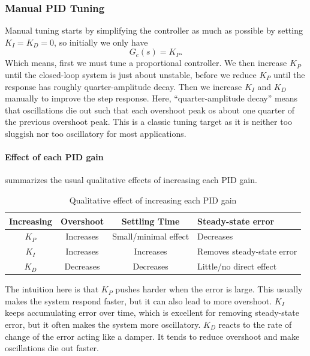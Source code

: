\subsubsection{Manual PID Tuning}
Manual tuning starts by simplifying the controller as much as possible by setting $K_I = K_D = 0$, so initially we only have
\begin{equation*}
  G_c(s) = K_P
.\end{equation*}
Which means, first we must tune a proportional controller.
We then increase $K_P$ until the closed-loop system is just about unstable, before we reduce $K_P$ until the response has roughly quarter-amplitude decay.
Then we increase $K_I$ and $K_D$ manually to improve the step response.
Here, ``quarter-amplitude decay'' means that oscillations die out such that each overshoot peak os about one quarter of the previous overshoot peak.
This is a classic tuning target as it is neither too sluggish nor too oscillatory for most applications.

\paragraph{Effect of each PID gain}
 summarizes the usual qualitative effects of increasing each PID gain.
\begin{table}[ht]
  \caption{Qualitative effect of increasing each PID gain}
  \label{tab:PIDq}
\begin{tabular}{|c|c|c|l|}
\hline
\textbf{Increasing} & \textbf{Overshoot} & \textbf{Settling Time} & \textbf{Steady-state error} \\ \hline
$K_P$               & Increases          & Small/minimal effect   & Decreases                   \\ \hline
$K_I$               & Increases          & Increases              & Removes steady-state error  \\ \hline
$K_D$               & Decreases          & Decreases              & Little/no direct effect     \\ \hline
\end{tabular}
\end{table}
The intuition here is that $K_P$ pushes harder when the error is large.
This usually makes the system respond faster, but it can also lead to more overshoot.
$K_I$ keeps accumulating error over time, which is excellent for removing steady-state error, but it often makes the system more oscillatory.
$K_D$ reacts to the rate of change of the error acting like a damper.
It tends to reduce overshoot and make oscillations die out faster.

